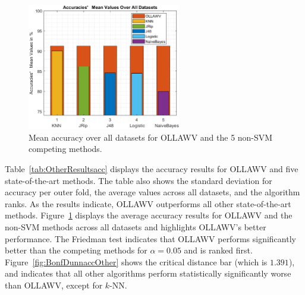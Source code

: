 \documentclass[reqno]{vcuthesis}
\numberwithin{equation}{chapter}
\begin{document}
\begin{table}[t!]
\begin{minipage}{0.9\textwidth}
{}
\captionsetup{width=\linewidth}
\label{fig:BonfDunnaccOther}
\end{minipage}
\end{table}

\begin{figure}
\centering
\includegraphics[width=0.6\textwidth]{figures/others.eps}
\caption{\small Mean accuracy over all datasets for OLLAWV and the 5 non-SVM competing methods.}
\label{fig:accother}
\end{figure}
Table~\ref{tab:OtherResultsacc} displays the accuracy results for OLLAWV and five state-of-the-art methods. The table also shows the standard deviation for accuracy per outer fold, the average values across all datasets, and the algorithm ranks. As the results indicate, OLLAWV outperforms all other state-of-the-art methods. Figure~\ref{fig:accother} displays the average accuracy results for OLLAWV and the non-SVM methods across all datasets and highlights OLLAWV's better performance. The Friedman test indicates that OLLAWV performs significantly better than the competing methods for $\alpha = 0.05$ and is ranked first. Figure~\ref{fig:BonfDunnaccOther} shows the critical distance bar (which is $1.391$), and indicates that all other algorithms perform statistically significantly worse than OLLAWV, except for $k$-NN. 
\end{document}
